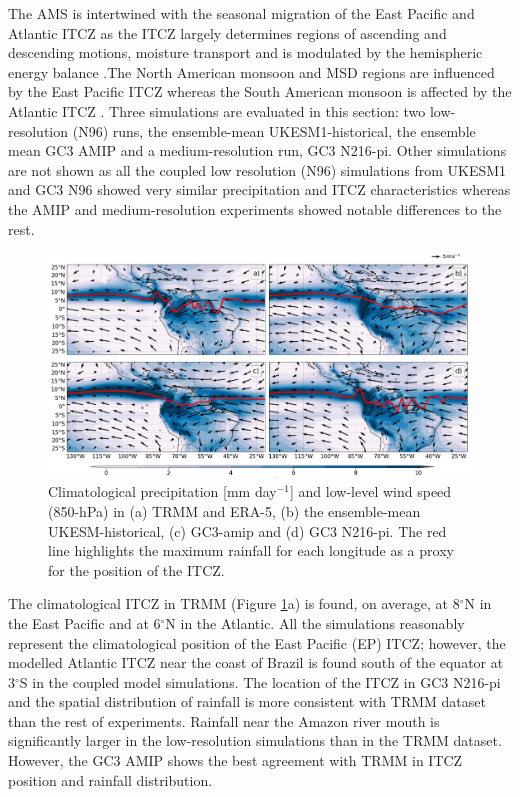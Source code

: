The AMS is intertwined with the seasonal migration of the East Pacific and Atlantic ITCZ as the ITCZ largely determines regions of ascending and descending motions, moisture transport and is modulated by the hemispheric energy balance \citep{oueslati2013,li2014,zhou2016,cai2019pantropical}.The North American monsoon and MSD regions are influenced by the East Pacific ITCZ whereas the South American monsoon is affected by the Atlantic ITCZ \citep{yoon2010atlantic,marengo2012}. 
Three simulations are evaluated in this section: two low-resolution (N96) runs, the ensemble-mean UKESM1-historical, the ensemble mean GC3 AMIP and a medium-resolution run, GC3 N216-pi.
Other simulations are not shown as all the coupled low resolution (N96) simulations from UKESM1 and GC3 N96 showed very similar precipitation and ITCZ characteristics whereas the AMIP and medium-resolution experiments showed notable differences to the rest. 


\begin{figure}[t!]
\centering
 \includegraphics[width=\linewidth]{figures/itcz_clim_d.png}
\caption[Climatological precipitation and ITCZ position]{ Climatological precipitation [mm day$^{-1}$] and low-level wind speed (850-hPa) in (a) TRMM and ERA-5, (b) the ensemble-mean UKESM-historical, (c) GC3-amip and (d) GC3 N216-pi. The red line highlights the maximum rainfall for each longitude as a proxy for the position of the ITCZ.  }
\label{fig:3}
\end{figure}

The climatological ITCZ in TRMM (Figure \ref{fig:3}a) is found, on average, at 8$^\circ$N in the East Pacific and at 6$^\circ$N in the Atlantic.
All the simulations reasonably represent the climatological position of the East Pacific (EP) ITCZ; however, the modelled Atlantic ITCZ near the coast of Brazil is found south of the equator at 3$^\circ$S in the coupled model simulations.
The location of the ITCZ in GC3 N216-pi and the spatial distribution of rainfall is more consistent with TRMM dataset than the rest of experiments.
Rainfall near the Amazon river mouth is significantly larger in the low-resolution simulations than in the TRMM dataset. 
 However, the GC3 AMIP shows the best agreement with TRMM in ITCZ position and rainfall distribution. 

